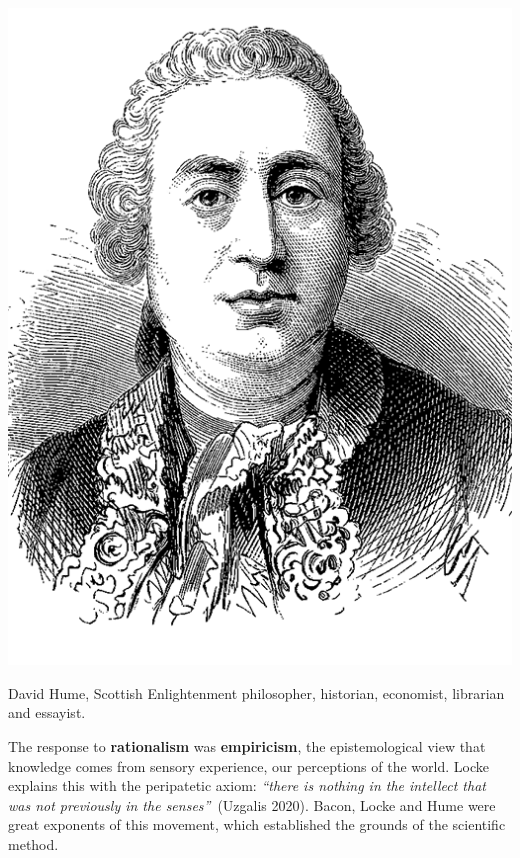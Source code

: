 \documentclass[
  letterpaper,
  12pt,
  british]{tufte-book}
\theoremstyle{plain}
\theoremstyle{definition}
\theoremstyle{plain}
\theoremstyle{remark}
\begin{document}
\begin{marginfigure}

{\centering \includegraphics{Images/hume.png}

}

\end{marginfigure}

David Hume, Scottish Enlightenment philosopher, historian, economist,
librarian and essayist.

The response to \textbf{rationalism} was \textbf{empiricism}, the
epistemological view that knowledge comes from sensory experience, our
perceptions of the world. Locke explains this with the peripatetic
axiom: \emph{``there is nothing in the intellect that was not
previously in the senses''}~(Uzgalis
2020).
Bacon, Locke and Hume were great exponents of this movement, which
established the grounds of the scientific method.
\end{document}
